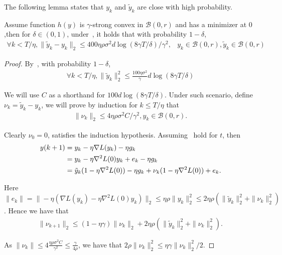 The following lemma states that $y_k$ and $\tilde y_k$ are close with high probability.
\begin{lemma}
\label{lem:track}
    Assume function $h(y)$ is $\gamma$-strong convex in $\mathcal{B}(0,r)$ and has a minimizer at $0$,then for $\delta \in (0,1)$, under~, it holds that with probability $1 - \delta$,
    \begin{align*}
        \forall k < T /\eta, \| \tilde y_k - y_k \|_2  \le   400{\eta \rho \sigma^2 d\log(8\gamma T/\delta)}/{\gamma^2}, 
        &y_k \in \mathcal{B}(0, r), \tilde y_k \in \mathcal{B}(0,r)
    \end{align*}
\end{lemma}



\begin{proof}
By~, with probability $1 - \delta$, 
\begin{align*}
   \forall k < T /\eta,  \| \tilde y_k \|_2^2 \le \frac{100 {\eta} \sigma^2}{{\gamma}} {d \log(8\gamma T/\delta)} 
\end{align*}

We will use $C$ as a shorthand for $100 {d \log(8\gamma T/\delta)}$. Under such scenario, define $\nu_k =  \tilde y_k - y_k $, we will prove by induction for $k \le T/\eta$ that 
\begin{align}
\label{eq:ind}
    \| \nu_k \|_2 \le 4{\eta \rho \sigma^2 C}/{\gamma^2} , y_k \in \mathcal{B}(0,r).
\end{align}

Clearly $\nu_0 = 0$, satisfies the induction hypothesis.
Assuming~ hold for $t$, then 
\begin{align*}
    y(k + 1) &=  y_k - \eta \nabla L(y_k) - \eta {g}_k \\
    &= y_k - \eta \nabla^2 L(0) y_k + e_k - \eta {g}_k \\
    &= \tilde y_k( 1 - \eta\nabla^2 L(0)) - \eta {g}_k + \nu_k( 1 - \eta\nabla^2 L(0)) + e_k.
\end{align*}

Here $\| e_k \| = \| -\eta ( \nabla L(y_k) -  \eta \nabla^2 L(0) y_k) \|_2 \le \eta \rho \|y_k\|_2^2 \le 2 \eta \rho (\|\tilde y_k \|_2^2 + \| \nu_k\|_2^2)$. Hence we have that
\begin{align*}
    \| \nu_{k + 1} \|_2 \le (1 - \eta \gamma) \| \nu_k \|_2 + 2 \eta \rho (\|\tilde y_k \|_2^2 + \| \nu_k\|_2^2). 
\end{align*}


As $\| \nu_k \| \le 4\frac{\eta \rho \sigma^2 C}{\gamma^2} \le \frac{\gamma}{4 \rho}$, we have that $2 \rho \| \nu_k \|_2^2 \le \eta \gamma \| \nu_k\|_2^2 / 2$. 


\end{proof}
